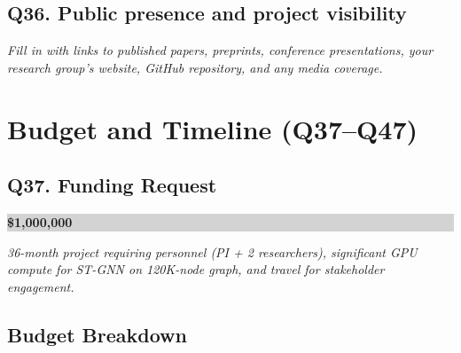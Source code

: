 \documentclass[11pt,letterpaper]{article}
\newcommand{\selection}[1]{%
    \vspace{0.2em}%
    \noindent\colorbox{lightgray}{\parbox{\dimexpr\textwidth-2\fboxsep}{%
        \vspace{0.3em}#1\vspace{0.3em}%
    }}%
    \vspace{0.5em}%
}
\newcommand{\note}[1]{%
    \vspace{0.2em}%
    {\small\textcolor{notegray}{\textit{#1}}}%
    \vspace{0.2em}%
}
\begin{document}
\subsection{Q36. Public presence and project visibility}
\note{Fill in with links to published papers, preprints, conference presentations, your research group's website, GitHub repository, and any media coverage.}

\section{Budget and Timeline (Q37--Q47)}

\subsection{Q37. Funding Request}
\selection{\textbf{\$1,000,000}}

\note{36-month project requiring personnel (PI + 2 researchers), significant GPU compute for ST-GNN on 120K-node graph, and travel for stakeholder engagement.}

\subsection{Budget Breakdown}
\end{document}
